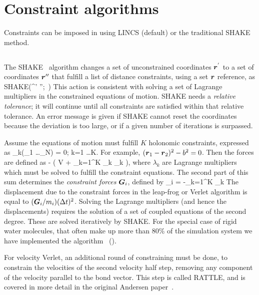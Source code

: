 \section{Constraint algorithms}
Constraints can be imposed in {\gromacs} using LINCS (default) or
the traditional SHAKE method.

\subsection{}
\label{subsec:SHAKE}
The SHAKE~\cite{Ryckaert77} algorithm changes a set of unconstrained
coordinates $\ve{r}^{'}$ to a set of coordinates $\ve{r}''$ that
fulfill a  list of distance constraints, using a set $\ve{r}$
reference, as
\beq
{\rm SHAKE}(^{'} \rightarrow {}'';\, )
\eeq
This action is consistent with solving a set of Lagrange multipliers
in the constrained equations of motion. SHAKE needs a {\em relative tolerance};
it will continue until all constraints are satisfied within
that relative tolerance. An error message is
given if SHAKE cannot reset the coordinates because the deviation is
too large, or if a given number of iterations is surpassed. 

Assume the equations of motion must fulfill $K$ holonomic constraints,
expressed as
\beq
\sigma_k(_1 \ldots {}_N) = 0; \;\; k=1 \ldots K.
\eeq
For example, $(\ve{r}_1 - \ve{r}_2)^2 - b^2 = 0$.
Then the forces are defined as
\beq
-  \left( V + \sum_{k=1}^K \lambda_k
\sigma_k \right),
\eeq
where $\lambda_k$ are Lagrange multipliers which must be solved to
fulfill the constraint equations. The second part of this sum
determines the {\em constraint forces} $\ve{G}_i$, defined by
\beq
{}_i = -\sum_{k=1}^K \lambda_k 
\eeq
The displacement due to the constraint forces in the leap-frog or
Verlet algorithm is equal to $(\ve{G}_i/m_i)(\Dt)^2$. Solving the
Lagrange multipliers (and hence the displacements) requires the
solution of a set of coupled equations of the second degree. These are
solved iteratively by SHAKE.
\label{subsec:SETTLE}
For the special case of rigid water molecules, that often make up more
than 80\% of the simulation system we have implemented the 
algorithm~\cite{Miyamoto92} ().

For velocity Verlet, an additional round of constraining must be
done, to constrain the velocities of the second velocity half step,
removing any component of the velocity parallel to the bond vector.
This step is called RATTLE, and is covered in more detail in the
original Andersen paper~\cite{Andersen1983a}.

